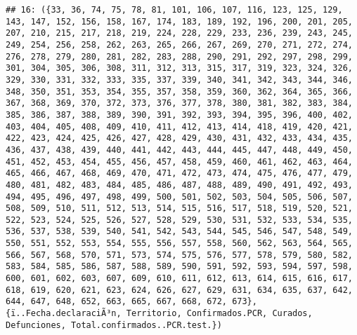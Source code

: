 \documentclass[
]{book}
\begin{document}
\begin{verbatim}
## 16: ({33, 36, 74, 75, 78, 81, 101, 106, 107, 116, 123, 125, 129, 143, 147, 152, 156, 158, 167, 174, 183, 189, 192, 196, 200, 201, 205, 207, 210, 215, 217, 218, 219, 224, 228, 229, 233, 236, 239, 243, 245, 249, 254, 256, 258, 262, 263, 265, 266, 267, 269, 270, 271, 272, 274, 276, 278, 279, 280, 281, 282, 283, 288, 290, 291, 292, 297, 298, 299, 301, 304, 305, 306, 308, 311, 312, 313, 315, 317, 319, 323, 324, 326, 329, 330, 331, 332, 333, 335, 337, 339, 340, 341, 342, 343, 344, 346, 348, 350, 351, 353, 354, 355, 357, 358, 359, 360, 362, 364, 365, 366, 367, 368, 369, 370, 372, 373, 376, 377, 378, 380, 381, 382, 383, 384, 385, 386, 387, 388, 389, 390, 391, 392, 393, 394, 395, 396, 400, 402, 403, 404, 405, 408, 409, 410, 411, 412, 413, 414, 418, 419, 420, 421, 422, 423, 424, 425, 426, 427, 428, 429, 430, 431, 432, 433, 434, 435, 436, 437, 438, 439, 440, 441, 442, 443, 444, 445, 447, 448, 449, 450, 451, 452, 453, 454, 455, 456, 457, 458, 459, 460, 461, 462, 463, 464, 465, 466, 467, 468, 469, 470, 471, 472, 473, 474, 475, 476, 477, 479, 480, 481, 482, 483, 484, 485, 486, 487, 488, 489, 490, 491, 492, 493, 494, 495, 496, 497, 498, 499, 500, 501, 502, 503, 504, 505, 506, 507, 508, 509, 510, 511, 512, 513, 514, 515, 516, 517, 518, 519, 520, 521, 522, 523, 524, 525, 526, 527, 528, 529, 530, 531, 532, 533, 534, 535, 536, 537, 538, 539, 540, 541, 542, 543, 544, 545, 546, 547, 548, 549, 550, 551, 552, 553, 554, 555, 556, 557, 558, 560, 562, 563, 564, 565, 566, 567, 568, 570, 571, 573, 574, 575, 576, 577, 578, 579, 580, 582, 583, 584, 585, 586, 587, 588, 589, 590, 591, 592, 593, 594, 597, 598, 600, 601, 602, 603, 607, 609, 610, 611, 612, 613, 614, 615, 616, 617, 618, 619, 620, 621, 623, 624, 626, 627, 629, 631, 634, 635, 637, 642, 644, 647, 648, 652, 663, 665, 667, 668, 672, 673}, {ï..Fecha.declaraciÃ³n, Territorio, Confirmados.PCR, Curados, Defunciones, Total.confirmados..PCR.test.})

\end{verbatim}
\end{document}
